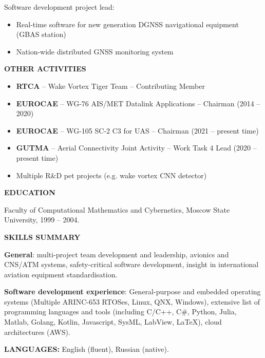 \documentclass[a4paper]{article}
\begin{document}
    Software development project lead:
	\begin{itemize}
		\setlength{\itemindent}{.5cm}
	    \item Real-time software for new generation DGNSS navigational equipment (GBAS station)
	    \item Nation-wide distributed GNSS monitoring system
    \end{itemize}
    \vspace{3mm}
    
    \textbf{OTHER ACTIVITIES}

	\begin{itemize}
	    \setlength{\itemindent}{.5cm}	
	    \item \textbf{RTCA} -- Wake Vortex Tiger Team -- Contributing Member
	    \item \textbf{EUROCAE} -- WG-76 AIS/MET Datalink Applications -- Chairman (2014 -- 2020)
	    \item \textbf{EUROCAE} -- WG-105 SC-2 C3 for UAS -- Chairman (2021 -- present time)
	    \item \textbf{GUTMA} -- Aerial Connectivity Joint Activity -- Work Task 4 Lead (2020 -- present time)
	    \item Multiple R\&D pet projects (e.g. wake vortex CNN detector)
    \end{itemize}
    \vspace{3mm}
    
    \textbf{EDUCATION}
    \vspace{3mm}
    
    Faculty of Computational Mathematics and Cybernetics, Moscow State University, 1999 -- 2004.
    \vspace{5mm}
    
    \textbf{SKILLS SUMMARY}
    \vspace{3mm}
    
    \textbf{General}: multi-project team development and leadership, avionics and CNS/ATM systems, safety-critical software development, insight in international aviation equipment standardisation.
    \vspace{3mm}
    
    \textbf{Software development experience}: General-purpose and embedded operating systems (Multiple ARINC-653 RTOSes, Linux, QNX, Windows), extensive list of programming languages and tools (including C/C++, C\#, Python, Julia, Matlab, Golang, Kotlin, Javascript, SysML, LabView, LaTeX), cloud architectures (AWS).
    \vspace{5mm}
    
    \textbf{LANGUAGES:} English (fluent), Russian (native).
\end{document}
